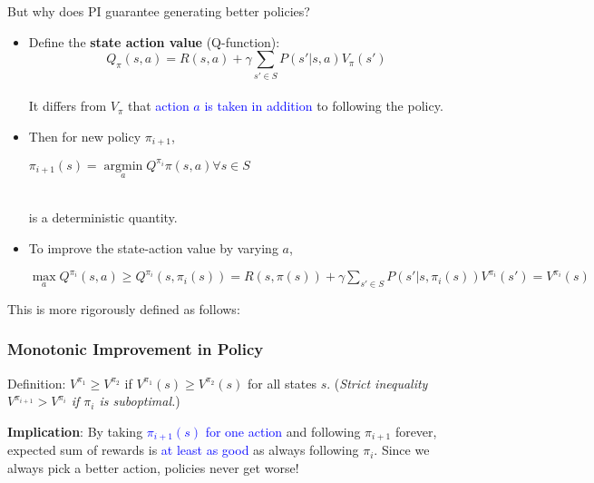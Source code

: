 \documentclass{article}
\begin{document}
But why does PI guarantee generating better policies?
\begin{itemize}
\item Define the \textbf{state action value} (Q-function):
    \begin{equation*}
        Q_{\pi} (s, a) = R(s, a) + \gamma \sum_{s' \in S} P(s' | s, a) V_{\pi} (s')
    \end{equation*}
    \\It differs from $V_{\pi}$ that \textcolor{blue}{action $a$ is taken in addition} to following the policy.
\item Then for new policy $\pi_{i+1}$, 
      \begin{center}
          $\pi_{i+1} (s) = \mathop{\arg\min}\limits_{a} Q^{\pi_i}{\pi}(s, a) \forall s \in S$
      \end{center}
      \\is a deterministic quantity.
\item To improve the state-action value by varying $a$,
      \begin{center}
          $\mathop{\max}\limits_{a} Q^{\pi_i} (s, a) \geq
          Q^{\pi_i} (s, \pi_{i}(s)) = R(s, \pi(s)) + \gamma \sum_{s' \in S} P(s' | s, \pi_i(s)) V^{{\pi}_i} (s')
          = V^{{\pi}_i} (s)
          $
      \end{center}
\end{itemize}

This is more rigorously defined as follows:
\begin{thmbox}
    \subsubsection*{Monotonic Improvement in Policy}
    Definition: $V^{\pi_{1}} \geq V^{\pi_{2}}$ if $V^{\pi_{1}}(s) \geq V^{\pi_{2}}(s)$ for all states $s$.
    (\textit{Strict inequality $V^{\pi_{i+1}} > V^{\pi_{i}}$  if $\pi_{i}$ is suboptimal.})
    \begin{prfbox}
        \textbf{Implication}: By taking \textcolor{blue}{$\pi_{i+1} (s)$ for one action} and following $\pi_{i+1}$ forever, expected sum of rewards is \textcolor{blue}{at least as good} as always following $\pi_{i}$.
        Since we always pick a better action, policies never get worse!
    \end{prfbox}
\end{thmbox}
\end{document}
